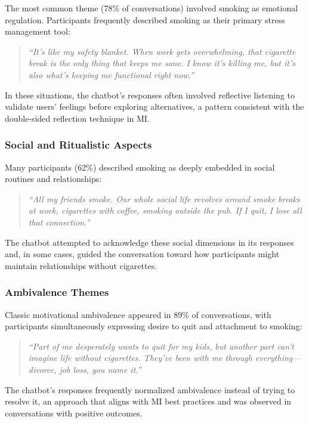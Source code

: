 The most common theme (78\% of conversations) involved smoking as emotional regulation. Participants frequently described smoking as their primary stress management tool:

\begin{quote}
\textit{``It's like my safety blanket. When work gets overwhelming, that cigarette break is the only thing that keeps me sane. I know it's killing me, but it's also what's keeping me functional right now.''}
\end{quote}

In these situations, the chatbot's responses often involved reflective listening to validate users' feelings before exploring alternatives, a pattern consistent with the double-sided reflection technique in MI.

\subsubsection{Social and Ritualistic Aspects}

Many participants (62\%) described smoking as deeply embedded in social routines and relationships:

\begin{quote}
\textit{``All my friends smoke. Our whole social life revolves around smoke breaks at work, cigarettes with coffee, smoking outside the pub. If I quit, I lose all that connection.''}
\end{quote}

The chatbot attempted to acknowledge these social dimensions in its responses and, in some cases, guided the conversation toward how participants might maintain relationships without cigarettes.

\subsubsection{Ambivalence Themes}

Classic motivational ambivalence appeared in 89\% of conversations, with participants simultaneously expressing desire to quit and attachment to smoking:

\begin{quote}
\textit{``Part of me desperately wants to quit for my kids, but another part can't imagine life without cigarettes. They've been with me through everything---divorce, job loss, you name it.''}
\end{quote}

The chatbot's responses frequently normalized ambivalence instead of trying to resolve it, an approach that aligns with MI best practices and was observed in conversations with positive outcomes.


